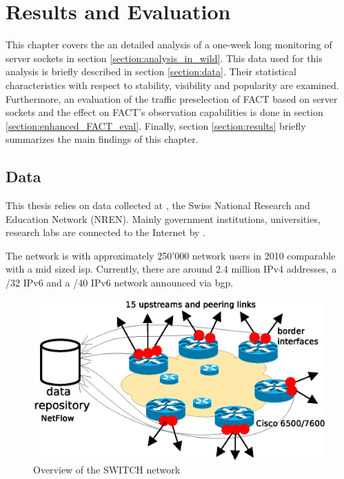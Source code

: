 

\chapter{Results and Evaluation 
\label{chapter:results}}

This chapter covers the an detailed analysis of a one-week long monitoring of server sockets in section \ref{section:analysis_in_wild}.
This data used for this analysis is briefly described in section \ref{section:data}.
Their statistical characteristics with respect to stability, visibility and popularity are examined. 
Furthermore, an evaluation of the traffic preselection of \gls{FACT} based on server sockets and the effect on \gls{FACT}'s observation capabilities is done in section \ref{section:enhanced_FACT_eval}.
Finally, section \ref{section:results} briefly summarizes the main findings of this chapter. 

\section{Data 
\label{section:data}}

This thesis relies on data collected at \citet{switch}, the Swiss National Research and Education Network (NREN). 
Mainly government institutions, universities, research labs are connected to the Internet by \citet{switch}\citep{Schatzmann:Mining}.

The \citet{switch} network is with approximately 250'000 network users in 2010 comparable with a mid sized \gls{isp}. Currently, there are around 2.4 million \gls{IPv4} addresses, a /32 IPv6 and a /40 \gls{IPv6} network announced via \gls{bgp}\citep{Schatzmann:Tracing}.
\begin{figure}
	[ht] \centering 
	\includegraphics[width=12cm]{images/network_overview.eps} \caption{Overview of the SWITCH network \citep{SchatzmanThesis2012}} 
	\label{fig:switch_nework} 
\end{figure}

